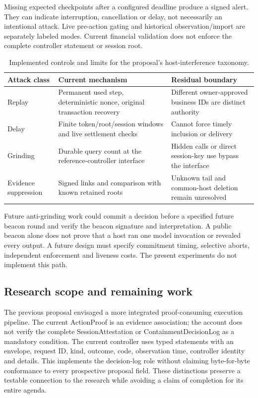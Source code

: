Missing expected checkpoints after a configured deadline produce a signed alert. They can indicate interruption, cancellation or delay, not necessarily an intentional attack. Live pre-action gating and historical observation/import are separately labeled modes. Current financial validation does not enforce the complete controller statement or session root.

\begin{table}[htbp]\centering\small
\begin{tabularx}{\linewidth}{L{2.8cm}YY}\toprule
Attack class & Current mechanism & Residual boundary\\\midrule
Replay & Permanent used step, deterministic nonce, original transaction recovery & Different owner-approved business IDs are distinct authority\\
Delay & Finite token/root/session windows and live settlement checks & Cannot force timely inclusion or delivery\\
Grinding & Durable query count at the reference-controller interface & Hidden calls or direct session-key use bypass the interface\\
Evidence suppression & Signed links and comparison with known retained roots & Unknown tail and common-host deletion remain unresolved\\\bottomrule
\end{tabularx}\caption{Implemented controls and limits for the proposal's host-interference taxonomy.}\label{tab:interference}\end{table}

Future anti-grinding work could commit a decision before a specified future beacon round and verify the beacon signature and interpretation.\citep{drand} A public beacon alone does not prove that a host ran one model invocation or revealed every output. A future design must specify commitment timing, selective aborts, independent enforcement and liveness costs. The present experiments do not implement this path.

\subsection{Research scope and remaining work}
The previous proposal envisaged a more integrated proof-consuming execution pipeline. The current ActionProof is an evidence association; the account does not verify the complete SessionAttestation or ContainmentDecisionLog as a mandatory condition. The current controller uses typed statements with an envelope, request ID, kind, outcome, code, observation time, controller identity and details. This implements the decision-log role without claiming byte-for-byte conformance to every prospective proposal field. These distinctions preserve a testable connection to the research while avoiding a claim of completion for its entire agenda.
